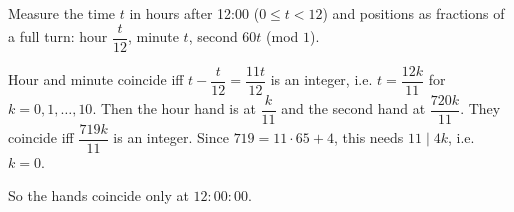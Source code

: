 Measure the time $t$ in hours after 12:00 ($0\le t<12$) and positions as fractions of a full turn: hour $\dfrac t{12}$, minute $t$, second $60t$ (mod $1$).

Hour and minute coincide iff $t-\dfrac t{12}=\dfrac{11t}{12}$ is an integer, i.e. $t=\dfrac{12k}{11}$ for $k=0,1,\dots,10$. Then the hour hand is at $\dfrac k{11}$ and the second hand at $\dfrac{720k}{11}$. They coincide iff $\dfrac{719k}{11}$ is an integer. Since $719=11\cdot65+4$, this needs $11\mid4k$, i.e. $k=0$.

So the hands coincide only at $\boxed{12{:}00{:}00}$.
